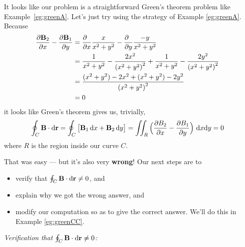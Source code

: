 \begin{eg}
It looks like our problem is a straightforward Green's theorem problem
like Example~\ref{eg:greenA}. Let's just try using the strategy of 
Example \ref{eg:greenA}. Because
\begin{align*}
\frac{\partial \vB_2}{\partial x} - \frac{\partial \vB_1}{\partial y}
&=\frac{\partial\hfill}{\partial x}\frac{x}{x^2+y^2} 
                - \frac{\partial\hfill}{\partial y}\frac{-y}{x^2+y^2} \\
&= \frac{1}{x^2+y^2} - \frac{2x^2}{{(x^2+y^2)}^2}
  +\frac{1}{x^2+y^2} - \frac{2y^2}{{(x^2+y^2)}^2}  \\
&= \frac{(x^2+y^2) - 2x^2 + (x^2+y^2) - 2y^2}{{(x^2+y^2)}^2}  \\
&=0
\end{align*}
it looks like Green's theorem gives us, trivially,
\begin{equation*}
\oint_C\mathbf{B}\cdot\mathrm{d}\mathbf{r}
=\oint_C\big[\mathbf{B}_1\,\mathrm{d}x +\mathbf{B}_2\,\mathrm{d}y\big]
= \iint_{R}\Big(\frac{\partial B_2}{\partial x} 
                - \frac{\partial B_1}{\partial y}\Big)\ \mathrm{d}x\mathrm{d}y
=0
\end{equation*}
where $R$ is the region inside our curve $C$. 

That was easy --- but it's also very \textbf{wrong}!
Our next steps are to 
\begin{itemize}\itemsep1pt \parskip0pt  %
\item
verify that $\oint_C\mathbf{B}\cdot\mathrm{d}\mathbf{r}\ne 0$, and 
\item
explain why we got the wrong answer, and
\item
modify our computation so as to give the correct answer.
We'll do this in Example \ref{eg:greenCC}.
\end{itemize}

\noindent
\emph{Verification that $\oint_C\mathbf{B}\cdot\mathrm{d}\mathbf{r}\ne 0$:}\ \ \ 


\end{eg}
